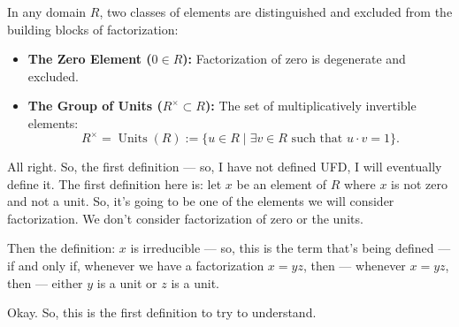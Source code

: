 
\begin{content}
In any domain $R$, two classes of elements are distinguished and excluded from the building blocks of factorization:
\begin{itemize}
    \item \textbf{The Zero Element ($0 \in R$):} Factorization of zero is degenerate and excluded.
    \item \textbf{The Group of Units ($R^\times \subset R$):} The set of multiplicatively invertible elements:
    \begin{equation}\label{eq:units-def}
    R^\times = \operatorname{Units}(R) := \{ u \in R \mid \exists v \in R \text{ such that } u \cdot v = 1 \}.
    \end{equation}
\end{itemize}

\end{content}

\begin{speech}[00:08:45 - 00:09:50]
All right. So, the first definition --- so, I have not defined UFD, I will eventually define it. The first definition here  is: let $x$  be an element of $R$ where $x$ is not zero and not a unit. So, it's going to be one of the elements we will consider factorization. We don't consider factorization of zero or the units.

Then the definition: $x$ is irreducible  --- so, this is the term that's being defined --- if and only if,  whenever  we have a factorization $x = y z$,  then  --- whenever $x = y z$, then --- either $y$  is a unit or $z$  is a unit.

Okay. So, this is the first definition to try to understand.
\end{speech}

